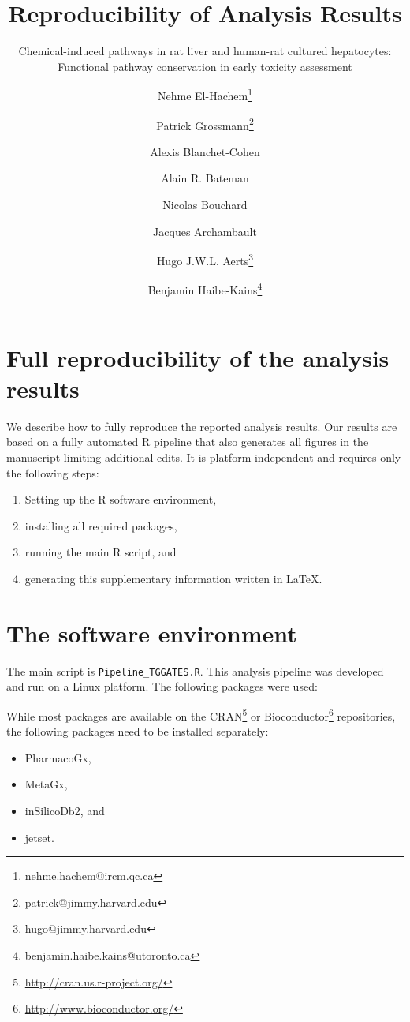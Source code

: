\documentclass[a4paper,10pt]{scrartcl}
\title{Reproducibility of Analysis Results}
\subtitle{Chemical-induced pathways in rat liver and human-rat cultured hepatocytes: Functional pathway conservation in early toxicity assessment}
\author[i]{Nehme El-Hachem\thanks{nehme.hachem@ircm.qc.ca}}
\author[i]{Patrick Grossmann\thanks{patrick@jimmy.harvard.edu}}
\author[ ]{Alexis Blanchet-Cohen}
\author[ ]{Alain R. Bateman}
\author[ ]{Nicolas Bouchard}
\author[ ]{Jacques Archambault}
\author[ii]{Hugo J.W.L. Aerts\thanks{hugo@jimmy.harvard.edu}}
\author[ii]{Benjamin Haibe-Kains\thanks{benjamin.haibe.kains@utoronto.ca}}
\affil[i]{co-first authors}
\affil[ii]{co-last authors}
\begin{document}
\maketitle

\newpage
\tableofcontents

\newpage

\section{Full reproducibility of the analysis results}

We describe how to fully reproduce the reported analysis results. Our results are based on a fully automated R \cite{rsoftware} pipeline that also generates all figures in the manuscript limiting additional edits. It is platform independent and requires only the following steps:

\begin{enumerate}
\item Setting up the R software environment,
\item installing all required packages,
\item running the main R script, and
\item generating this supplementary information written in \LaTeX \cite{}.
\end{enumerate}

\section{The software environment}

The main script is \verb+Pipeline_TGGATES.R+. This analysis pipeline was developed and run on a Linux platform. The following packages were used:

% 

While most packages are available on the CRAN\footnote{\url{http://cran.us.r-project.org/}} or Bioconductor\footnote{\url{http://www.bioconductor.org/}} repositories, the following packages need to be installed separately:

\begin{itemize}
 \item PharmacoGx,
 \item MetaGx,
 \item inSilicoDb2, and
 \item jetset.
\end{itemize}
\end{document}

